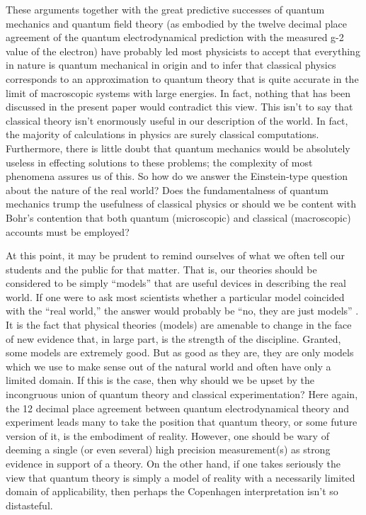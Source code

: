 \documentclass [12pt]{revtex4}
\begin{document}
These arguments together with the great predictive successes of
quantum mechanics and quantum field theory (as embodied by the
twelve decimal place agreement of the quantum electrodynamical
prediction with the measured g-2 value of the electron) have
probably led most physicists to accept that everything in nature is
quantum mechanical in origin and to infer that classical physics
corresponds to an approximation to quantum theory that is quite
accurate in the limit of macroscopic systems with large energies. In
fact, nothing that has been discussed in the present paper would
contradict this view. This isn't to say that classical theory isn't
enormously useful in our description of the world. In fact, the
majority of calculations in physics are surely classical
computations. Furthermore, there is little doubt that quantum
mechanics would be absolutely useless in effecting solutions to
these problems; the complexity of most phenomena assures us of this.
So how do we answer the Einstein-type question about the nature of
the real world? Does the fundamentalness of quantum mechanics trump
the usefulness of classical physics or should we be content with
Bohr's contention that both quantum (microscopic) and classical
(macroscopic) accounts must be employed?

At this point, it may be prudent to remind ourselves of what we
often tell our students and the public for that matter. That is, our
theories should be considered to be simply ``models'' that are
useful devices in describing the real world. If one were to ask most
scientists whether a particular model coincided with the ``real
world,'' the answer would probably be ``no, they are just models''
\cite{conventionalism}. It is the fact that physical theories
(models) are amenable to change in the face of new evidence that, in
large part, is the strength of the discipline. Granted, some models
are extremely good. But as good as they are, they are only models
which we use to make sense out of the natural world and often have
only a limited domain. If this is the case, then why should we be
upset by the incongruous union of quantum theory and classical
experimentation? Here again, the 12 decimal place agreement between
quantum electrodynamical theory and experiment leads many to take
the position that quantum theory, or some future version of it, is
the embodiment of reality. However, one should be wary of
deeming a single (or even several) high precision measurement(s)
as strong evidence in support of a theory. \cite{support} On the other hand, if one
takes seriously the view that quantum theory is simply a model of
reality with a necessarily limited domain of applicability, then
perhaps the Copenhagen interpretation isn't so distasteful.
\end{document}
